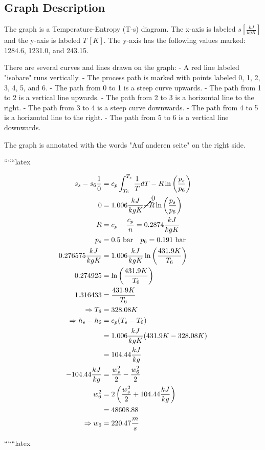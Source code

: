 \subsection*{Graph Description}
The graph is a Temperature-Entropy (T-s) diagram. The x-axis is labeled $s \left[ \frac{kJ}{kgK} \right]$ and the y-axis is labeled $T \, [K]$. The y-axis has the following values marked: 1284.6, 1231.0, and 243.15. 

There are several curves and lines drawn on the graph:
- A red line labeled "isobare" runs vertically.
- The process path is marked with points labeled 0, 1, 2, 3, 4, 5, and 6.
- The path from 0 to 1 is a steep curve upwards.
- The path from 1 to 2 is a vertical line upwards.
- The path from 2 to 3 is a horizontal line to the right.
- The path from 3 to 4 is a steep curve downwards.
- The path from 4 to 5 is a horizontal line to the right.
- The path from 5 to 6 is a vertical line downwards.

The graph is annotated with the words "Auf anderen seite" on the right side.

``````latex


\begin{align*}
s_s - s_6 \frac{1}{\dot{0}} &= c_p \int_{T_6}^{T_s} \frac{1}{T} dT - R \ln \left( \frac{p_s}{p_6} \right) \\
0 &= 1.006 \frac{kJ}{kgK} \cancelto{0} - R \ln \left( \frac{p_s}{p_6} \right) \\
R &= c_p - \frac{c_p}{n} = 0.2874 \frac{kJ}{kgK} \\
p_s &= 0.5 \text{ bar} \quad p_6 = 0.191 \text{ bar} \\
0.276575 \frac{kJ}{kgK} &= 1.006 \frac{kJ}{kgK} \ln \left( \frac{431.9 K}{T_6} \right) \\
0.274925 &= \ln \left( \frac{431.9 K}{T_6} \right) \\
1.316433 &= \frac{431.9 K}{T_6} \\
\Rightarrow T_6 &= 328.08 K \\
\Rightarrow h_s - h_6 &= c_p (T_s - T_6) \\
&= 1.006 \frac{kJ}{kgK} (431.9 K - 328.08 K) \\
&= 104.44 \frac{kJ}{kg} \\
-104.44 \frac{kJ}{kg} &= \frac{w_s^2}{2} - \frac{w_6^2}{2} \\
w_6^2 &= 2 \left( \frac{w_s^2}{2} + 104.44 \frac{kJ}{kg} \right) \\
&= 48608.88 \\
\Rightarrow w_6 &= 220.47 \frac{m}{s}
\end{align*}

``````latex


